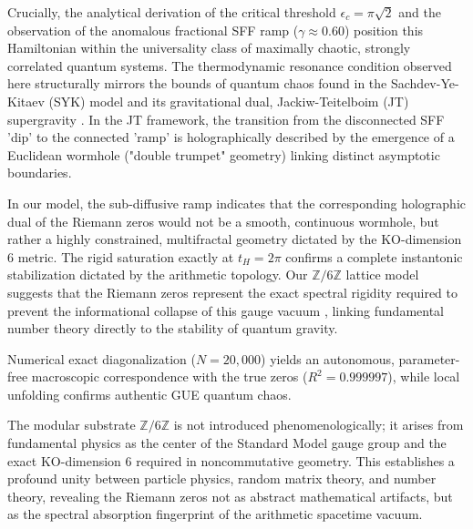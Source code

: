 \documentclass[aps,prl,preprint,superscriptaddress,floatfix]{revtex4-2}
\newcommand{\Zmod}{\mathbb{Z}/6\mathbb{Z}}
\begin{document}
Crucially, the analytical derivation of the critical threshold $\epsilon_c = \pi\sqrt{2}$ and the observation of the anomalous fractional SFF ramp ($\gamma \approx 0.60$) position this Hamiltonian within the universality class of maximally chaotic, strongly correlated quantum systems. The thermodynamic resonance condition observed here structurally mirrors the bounds of quantum chaos found in the Sachdev-Ye-Kitaev (SYK) model and its gravitational dual, Jackiw-Teitelboim (JT) supergravity \cite{Saad2019}. In the JT framework, the transition from the disconnected SFF 'dip' to the connected 'ramp' is holographically described by the emergence of a Euclidean wormhole ("double trumpet" geometry) linking distinct asymptotic boundaries.

In our model, the sub-diffusive ramp indicates that the corresponding holographic dual of the Riemann zeros would not be a smooth, continuous wormhole, but rather a highly constrained, multifractal geometry dictated by the KO-dimension 6 metric. The rigid saturation exactly at $t_H = 2\pi$ confirms a complete instantonic stabilization dictated by the arithmetic topology. Our $\Zmod$ lattice model suggests that the Riemann zeros represent the exact spectral rigidity required to prevent the informational collapse of this gauge vacuum \cite{Connes2008}, linking fundamental number theory directly to the stability of quantum gravity.

Numerical exact diagonalization ($N=20,000$) yields an autonomous, parameter-free macroscopic correspondence with the true zeros ($R^2 = 0.999997$), while local unfolding confirms authentic GUE quantum chaos.

The modular substrate $\Zmod$ is not introduced phenomenologically; it arises from fundamental physics as the center of the Standard Model gauge group and the exact KO-dimension 6 required in noncommutative geometry. This establishes a profound unity between particle physics, random matrix theory, and number theory, revealing the Riemann zeros not as abstract mathematical artifacts, but as the spectral absorption fingerprint of the arithmetic spacetime vacuum.
\end{document}
